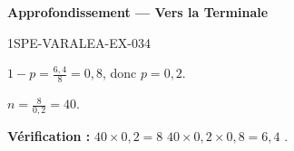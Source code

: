 \begin{center}\textbf{Approfondissement — Vers la Terminale}\end{center}
\begin{corrige}{1SPE-VARALEA-EX-034}

$1-p = \frac{6{,}4}{8} = 0{,}8$, donc $p = 0{,}2$.

$n = \frac{8}{0{,}2} = 40$.

\textbf{Vérification :} $40 \times 0{,}2 = 8$ \checkmark \quad $40 \times 0{,}2 \times 0{,}8 = 6{,}4$ \checkmark.

\end{corrige}
